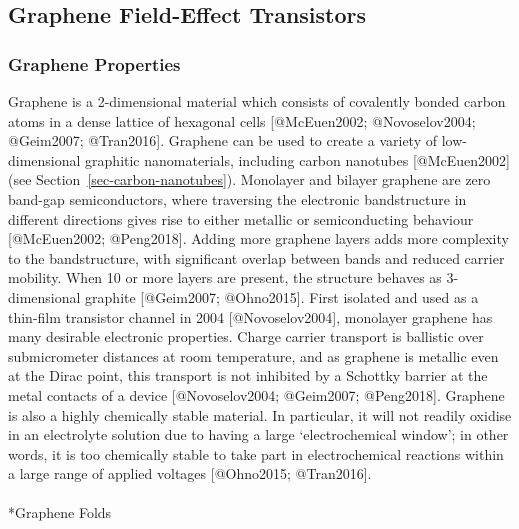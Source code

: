\documentclass[
  letterpaper,
  DIV=11,
  numbers=noendperiod]{scrartcl}
\makeatletter
\let\oldparagraph\paragraph
\renewcommand{\paragraph}{
    \@ifstar
      \xxxParagraphStar
      \xxxParagraphNoStar
  }
\newcommand{\xxxParagraphStar}[1]{\oldparagraph*{#1}\mbox{}}
\newcommand{\xxxParagraphNoStar}[1]{\oldparagraph{#1}\mbox{}}
\makeatother
\begin{document}
\subsection{Graphene Field-Effect
Transistors}\label{graphene-field-effect-transistors}

\subsubsection{Graphene Properties}\label{graphene-properties}

Graphene is a 2-dimensional material which consists of covalently bonded
carbon atoms in a dense lattice of hexagonal cells {[}@McEuen2002;
@Novoselov2004; @Geim2007; @Tran2016{]}. Graphene can be used to create
a variety of low-dimensional graphitic nanomaterials, including carbon
nanotubes {[}@McEuen2002{]} (see Section~\ref{sec-carbon-nanotubes}).
Monolayer and bilayer graphene are zero band-gap semiconductors, where
traversing the electronic bandstructure in different directions gives
rise to either metallic or semiconducting behaviour {[}@McEuen2002;
@Peng2018{]}. Adding more graphene layers adds more complexity to the
bandstructure, with significant overlap between bands and reduced
carrier mobility. When 10 or more layers are present, the structure
behaves as 3-dimensional graphite {[}@Geim2007; @Ohno2015{]}. First
isolated and used as a thin-film transistor channel in 2004
{[}@Novoselov2004{]}, monolayer graphene has many desirable electronic
properties. Charge carrier transport is ballistic over submicrometer
distances at room temperature, and as graphene is metallic even at the
Dirac point, this transport is not inhibited by a Schottky barrier at
the metal contacts of a device {[}@Novoselov2004; @Geim2007;
@Peng2018{]}. Graphene is also a highly chemically stable material. In
particular, it will not readily oxidise in an electrolyte solution due
to having a large `electrochemical window'; in other words, it is too
chemically stable to take part in electrochemical reactions within a
large range of applied voltages {[}@Ohno2015; @Tran2016{]}.

\paragraph*{Graphene Folds}\label{graphene-folds}
\end{document}
